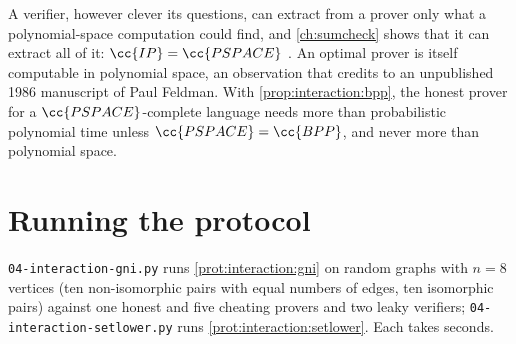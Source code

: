 \begin{refsection}
A verifier, however clever its questions, can extract from a prover only what a polynomial-space computation could find, and \cref{ch:sumcheck} shows that it can extract all of it: $\cc{IP}=\cc{PSPACE}$ \parencite{LundEtAl1992,Shamir1992}. An optimal prover is itself computable in polynomial space, an observation that \textcite{Babai1990} credits to an unpublished 1986 manuscript of Paul Feldman. With \cref{prop:interaction:bpp}, the honest prover for a $\cc{PSPACE}$-complete language needs more than probabilistic polynomial time unless $\cc{PSPACE}=\cc{BPP}$, and never more than polynomial space.

\section{Running the protocol}\label{sec:interaction:running}

\texttt{04-interaction-gni.py} runs \cref{prot:interaction:gni} on random graphs with $n=8$ vertices (ten non-isomorphic pairs with equal numbers of edges, ten isomorphic pairs) against one honest and five cheating provers and two leaky verifiers; \texttt{04-interaction-setlower.py} runs \cref{prot:interaction:setlower}. Each takes seconds.


\end{refsection}
